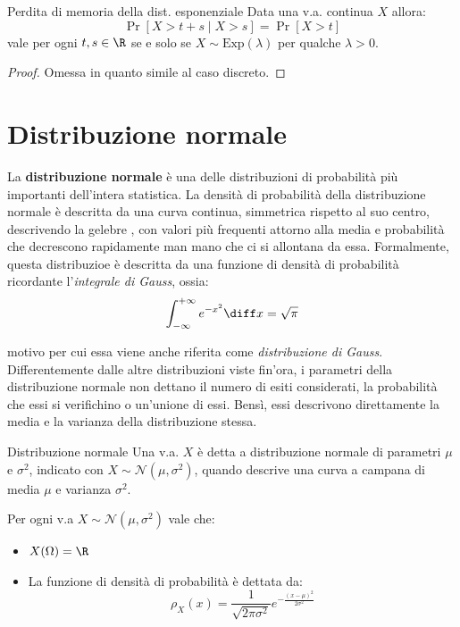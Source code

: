 \documentclass[a4paper, 12pt]{report}
\begin{document}
    \begin{framedthm}{Perdita di memoria della dist. esponenziale}
        Data una v.a. continua $X$ allora:
        \[\Pr[X > t + s \mid X > s ] = \Pr[X > t] \]
        vale per ogni $t,s \in \R$ se e solo se $X \sim \mathrm{Exp}(\lambda)$ per qualche $\lambda > 0$.
    \end{framedthm}

    \begin{proof}
        Omessa in quanto simile al caso discreto.
    \end{proof}

    \section{Distribuzione normale}

    La \textbf{distribuzione normale} è una delle distribuzioni di probabilità più importanti dell'intera statistica. La densità di probabilità della distribuzione normale è descritta da una curva continua, simmetrica rispetto al suo centro, descrivendo la gelebre , con valori più frequenti attorno alla media e probabilità che decrescono rapidamente man mano che ci si allontana da essa. Formalmente, questa distribuzioe è descritta da una funzione di densità di probabilità ricordante l'\textit{integrale di Gauss}, ossia:
    \[\int_{-\infty}^{+\infty} e^{-x^2} \diff x = \sqrt{\pi}\]
    
    motivo per cui essa viene anche riferita come \textit{distribuzione di Gauss}. Differentemente dalle altre distribuzioni viste fin'ora, i parametri della distribuzione normale non dettano il numero di esiti considerati, la probabilità che essi si verifichino o un'unione di essi. Bensì, essi descrivono direttamente la media e la varianza della distribuzione stessa.
    
    \begin{frameddefn}{Distribuzione normale}
        Una v.a. $X$ è detta a distribuzione normale di parametri $\mu$ e $\sigma^2$, indicato con $X \sim \mathcal{N}(\mu, \sigma^2)$, quando descrive una curva a campana di media $\mu$ e varianza $\sigma^2$.

        Per ogni v.a $X \sim \mathcal{N}(\mu, \sigma^2)$ vale che:
        \begin{itemize}
            \item $X(\Omega) = \R$
            \item La funzione di densità di probabilità è dettata da:
            \[\rho_X(x) = \frac{1}{\sqrt{2 \pi \sigma^2}} e^{- \frac{(x-\mu)^2}{2\sigma^2}}\]
        \end{itemize}
    \end{frameddefn}
\end{document}
